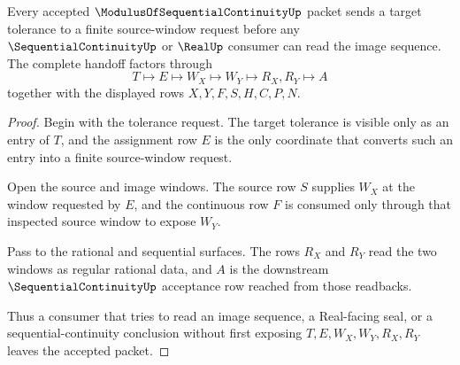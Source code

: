 \begin{theorem}
\label{thm:modulus-of-sequential-continuity-tolerance-window-handoff}
Every accepted $\ModulusOfSequentialContinuityUp$ packet sends a target tolerance to a finite source-window request before any $\SequentialContinuityUp$ or $\RealUp$ consumer can read the image sequence. The complete handoff factors through
$$
T\longmapsto E\longmapsto W_X\longmapsto W_Y\longmapsto R_X,R_Y\longmapsto A
$$
together with the displayed rows $X,Y,F,S,H,C,P,N$.
\end{theorem}
\begin{proof}
Begin with the tolerance request. The target tolerance is visible only as an entry of $T$, and the assignment row $E$ is the only coordinate that converts such an entry into a finite source-window request.

Open the source and image windows. The source row $S$ supplies $W_X$ at the window requested by $E$, and the continuous row $F$ is consumed only through that inspected source window to expose $W_Y$.

Pass to the rational and sequential surfaces. The rows $R_X$ and $R_Y$ read the two windows as regular rational data, and $A$ is the downstream $\SequentialContinuityUp$ acceptance row reached from those readbacks.

Thus a consumer that tries to read an image sequence, a Real-facing seal, or a sequential-continuity conclusion without first exposing $T,E,W_X,W_Y,R_X,R_Y$ leaves the accepted packet.
\end{proof}


\begin{closurestatus}{\ModulusOfSequentialContinuityUp}
  \theoryclosure{\seedClosure}
  \formalstatus{\unformalizedV}
\end{closurestatus}
